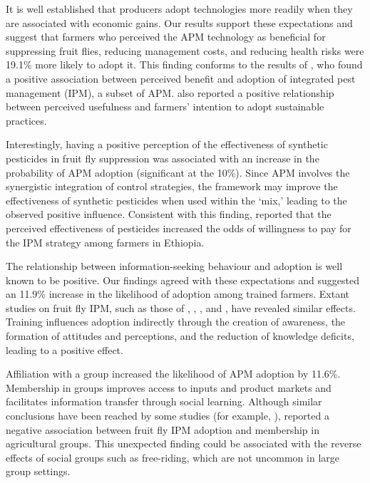 \documentclass[fleqn,twoside,reqno]{article}
\begin{document}
It is well established that producers adopt technologies more readily when they are associated with economic gains. Our results support these expectations and suggest that farmers who perceived the APM technology as beneficial for suppressing fruit flies, reducing management costs, and reducing health risks were 19.1\% more likely to adopt it. This finding conforms to the results of \cite{Kabir2022}, who found a positive association between perceived benefit and adoption of integrated pest management (IPM), a subset of APM. \cite{Zeweld2017} also reported a positive relationship between perceived usefulness and farmers’ intention to adopt sustainable practices.

Interestingly, having a positive perception of the effectiveness of synthetic pesticides in fruit fly suppression was associated with an increase in the probability of APM adoption (significant at the 10\%). Since APM involves the synergistic integration of control strategies, the framework may improve the effectiveness of synthetic pesticides when used within the ‘mix,’ leading to the observed positive influence. Consistent with this finding, \cite{Muriithi2021} reported that the perceived effectiveness of pesticides increased the odds of willingness to pay for the IPM strategy among farmers in Ethiopia. 

The relationship between information-seeking behaviour and adoption is well known to be positive. Our findings agreed with these expectations and suggested an 11.9\% increase in the likelihood of adoption among trained farmers. Extant studies on fruit fly IPM, such as those of \cite{Midingoyi2019}, \cite{Mwungu2020}, \cite{Wangithi2021}, and \cite{Otieno2023}, have revealed similar effects. Training influences adoption indirectly through the creation of awareness, the formation of attitudes and perceptions, and the reduction of knowledge deficits, leading to a positive effect.

Affiliation with a group increased the likelihood of APM adoption by 11.6\%. Membership in groups improves access to inputs and product markets and facilitates information transfer through social learning. Although similar conclusions have been reached by some studies (for example, \cite{Kabir2022, Midingoyi2019, Otieno2023}), \cite{Mwungu2020} reported a negative association between fruit fly IPM adoption and membership in agricultural groups. This unexpected finding could be associated with the reverse effects of social groups such as free-riding, which are not uncommon in large group settings.
\end{document}
